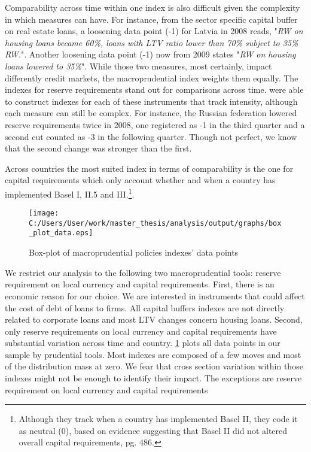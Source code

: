 \documentclass[12pt]{article}
\begin{document}
	  Comparability across time within one index is also difficult given the complexity in which measures can have. For instance, from the 
	  sector specific capital buffer on real estate loans, a loosening data point (-1) for Latvia in 2008 reads, "\textit{RW on housing loans became 60\%, loans with LTV ratio lower than 70\% subject to 35\% RW.}". Another loosening data point (-1) now from 2009 states "\textit{RW on housing loans lowered to 35\%}". While those two measures, most certainly, impact differently credit markets, the macroprudential index weights them equally. The indexes for reserve requirements stand out for comparisons across time. \cite{cerutti2017changes} were able to construct indexes for each of these instruments that track intensity, although each measure can still be complex. For instance, the Russian federation lowered reserve requirements twice in 2008, one registered as -1 in the third quarter and a second cut counted as -3 in the following quarter. Though not perfect, we know that the second change was stronger than the first.  
	  
	  Across countries the most suited index in terms of comparability is the one for capital requirements which only account whether and when a country has implemented Basel I, II.5 and III.\footnote{Although they track when a country has implemented Basel II, they code it as neutral (0), based on evidence suggesting that Basel II did not altered overall capital requirements, \cite{cerutti2017changes} pg. 486.}.
	   
	  \begin{figure}[h!]
	  	\centering
	  	\caption{Box-plot of macroprudential policies indexes' data points}
	  	\texttt{[image: C:/Users/User/work/master\_thesis/analysis/output/graphs/box\_plot\_data.eps]}
	  	\label{fig:boxplot data}
	  \end{figure}
  
	  We restrict our analysis to the following two macroprudential tools: reserve requirement on local currency and  capital requirements. First, there is an economic reason for our choice. We are interested in instruments that could affect the cost of debt of loans to firms. All capital buffers indexes are not directly related to corporate loans and most LTV changes concern housing loans. Second, only reserve requirements on local currency and capital requirements have substantial variation across time and country. \ref{fig:boxplot data} plots all data points in our sample by prudential tools. Most indexes are composed of a few moves and most of the distribution mass at zero. We fear that cross section variation within those indexes might not be enough to identify their impact. The exceptions are reserve requirement on local currency and capital requirements 
	  	
\end{document}
